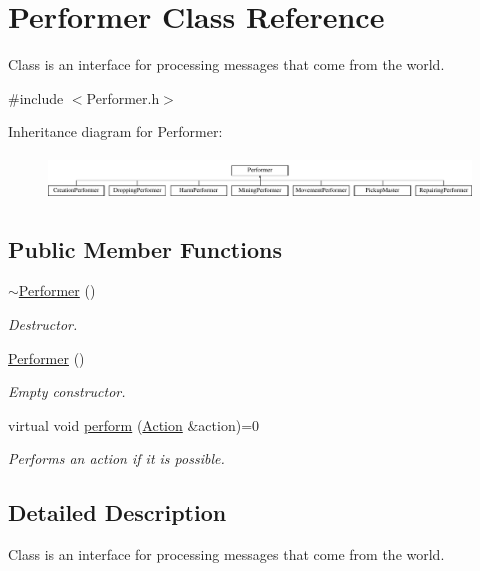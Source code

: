 \hypertarget{classPerformer}{\section{Performer Class Reference}
\label{classPerformer}
}


Class is an interface for processing messages that come from the world.  




{\ttfamily \#include $<$Performer.\-h$>$}

Inheritance diagram for Performer\-:\begin{figure}[H]
\begin{center}
\leavevmode
\includegraphics[height=1.185185cm]{classPerformer}
\end{center}
\end{figure}
\subsection*{Public Member Functions}
\begin{DoxyCompactItemize}
\item 
\hyperlink{classPerformer_a1674cebd080bafc7c1abf5c80afa73b1}{$\sim$\-Performer} ()
\begin{DoxyCompactList}\small\item\em Destructor. \end{DoxyCompactList}\item 
\hyperlink{classPerformer_a0c02bdbee11729e0191301de64e5020d}{Performer} ()
\begin{DoxyCompactList}\small\item\em Empty constructor. \end{DoxyCompactList}\item 
virtual void \hyperlink{classPerformer_a4cfa828ea1f9f07fd1aa9d330adfb5d5}{perform} (\hyperlink{classAction}{Action} \&action)=0
\begin{DoxyCompactList}\small\item\em Performs an action if it is possible. \end{DoxyCompactList}\end{DoxyCompactItemize}


\subsection{Detailed Description}
Class is an interface for processing messages that come from the world. 


